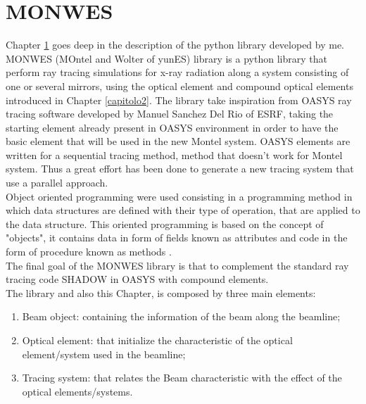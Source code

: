 \chapter{MONWES}
\label{capitolo3}
\thispagestyle{empty}
\vspace{0.5cm}

Chapter \ref{capitolo3} goes deep in the description of the python library developed by me. MONWES (MOntel and Wolter of yunES) library is a python library that perform ray tracing simulations for x-ray radiation along a system consisting of one or several mirrors, using the optical element and compound optical elements introduced in Chapter \ref{capitolo2}. The library take inspiration from OASYS ray tracing software developed by Manuel Sanchez Del Rio of ESRF, taking the starting element already present in OASYS environment in order to have the basic element that will be used in the new Montel system. OASYS elements are written for a sequential tracing method, method that doesn't work for Montel system. Thus a great effort has been done to generate a new tracing system that use a parallel approach.
\\
Object oriented programming were used consisting in a programming method in which data structures are defined with their type of operation, that are applied to the data structure. This oriented programming is based on the concept of "objects", it contains data in form of fields known as attributes and code in the form of procedure known as methods \cite{gamma2001design}.
\\
The final goal of the MONWES library is that to complement the standard ray tracing code SHADOW in OASYS with compound elements.
\\
The library and also this Chapter, is composed by three main elements:
\begin{enumerate}
\item Beam object: containing the information of the beam along the beamline;
\item Optical element: that initialize the characteristic of the optical element/system used in the beamline;
\item Tracing system: that relates the Beam characteristic with the effect of the optical elements/systems.
\end{enumerate}

\vspace{0.5cm}

